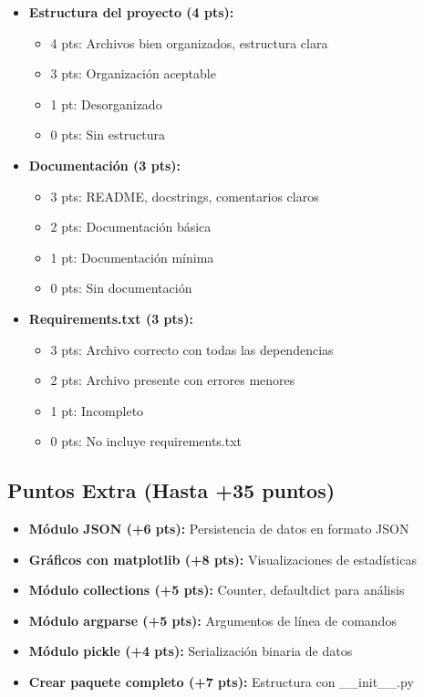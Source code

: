 \documentclass[12pt,a4paper]{article}
\begin{document}
\begin{itemize}[leftmargin=*]
    \item \textbf{Estructura del proyecto (4 pts):}
    \begin{itemize}
        \item 4 pts: Archivos bien organizados, estructura clara
        \item 3 pts: Organización aceptable
        \item 1 pt: Desorganizado
        \item 0 pts: Sin estructura
    \end{itemize}
    
    \item \textbf{Documentación (3 pts):}
    \begin{itemize}
        \item 3 pts: README, docstrings, comentarios claros
        \item 2 pts: Documentación básica
        \item 1 pt: Documentación mínima
        \item 0 pts: Sin documentación
    \end{itemize}
    
    \item \textbf{Requirements.txt (3 pts):}
    \begin{itemize}
        \item 3 pts: Archivo correcto con todas las dependencias
        \item 2 pts: Archivo presente con errores menores
        \item 1 pt: Incompleto
        \item 0 pts: No incluye requirements.txt
    \end{itemize}
\end{itemize}

\subsection{Puntos Extra (Hasta +35 puntos)}

\begin{itemize}[leftmargin=*]
    \item \textbf{Módulo JSON (+6 pts):} Persistencia de datos en formato JSON
    \item \textbf{Gráficos con matplotlib (+8 pts):} Visualizaciones de estadísticas
    \item \textbf{Módulo collections (+5 pts):} Counter, defaultdict para análisis
    \item \textbf{Módulo argparse (+5 pts):} Argumentos de línea de comandos
    \item \textbf{Módulo pickle (+4 pts):} Serialización binaria de datos
    \item \textbf{Crear paquete completo (+7 pts):} Estructura con \_\_init\_\_.py
\end{itemize}
\end{document}
